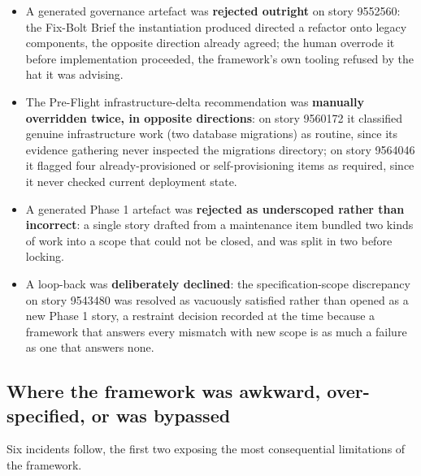 \begin{itemize}[leftmargin=0.6cm, itemsep=0.5em]

\item A generated governance artefact was \textbf{rejected outright} on story 9552560: the Fix-Bolt Brief the instantiation produced directed a refactor onto legacy components, the opposite direction already agreed; the human overrode it before implementation proceeded, the framework's own tooling refused by the hat it was advising.

\item The Pre-Flight infrastructure-delta recommendation was \textbf{manually overridden twice, in opposite directions}: on story 9560172 it classified genuine infrastructure work (two database migrations) as routine, since its evidence gathering never inspected the migrations directory; on story 9564046 it flagged four already-provisioned or self-provisioning items as required, since it never checked current deployment state.

\item A generated Phase 1 artefact was \textbf{rejected as underscoped rather than incorrect}: a single story drafted from a maintenance item bundled two kinds of work into a scope that could not be closed, and was split in two before locking.

\item A loop-back was \textbf{deliberately declined}: the specification-scope discrepancy on story 9543480 was resolved as vacuously satisfied rather than opened as a new Phase 1 story, a restraint decision recorded at the time because a framework that answers every mismatch with new scope is as much a failure as one that answers none.

\end{itemize}


\subsection*{Where the framework was awkward, over-specified, or was bypassed}
Six incidents follow, the first two exposing the most consequential limitations of the framework.

